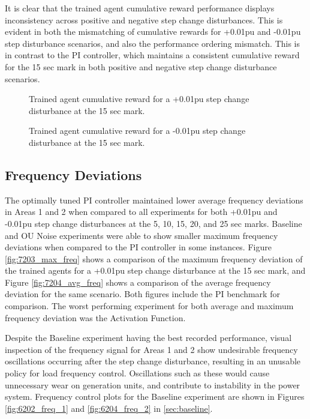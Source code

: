 It is clear that the trained agent cumulative reward performance displays inconsistency across positive and negative step change disturbances. This is evident in both the mismatching of cumulative rewards for +0.01pu and -0.01pu step disturbance scenarios, and also the performance ordering mismatch. This is in contrast to the PI controller, which maintains a consistent cumulative reward for the 15 sec mark in both positive and negative step change disturbance scenarios.
\begin{figure}[h]
	\begin{minipage}[t]{0.50\textwidth}
		\centering
		\resizebox{7cm}{!}{}
		\caption{Trained agent cumulative reward for a +0.01pu step change disturbance at the 15 sec mark.}\label{fig:7201_cum_reward_pos}
	\end{minipage}
	\hspace{0.25cm}
	\begin{minipage}[t]{0.50\textwidth}
		\resizebox{7cm}{!}{}
		\caption{Trained agent cumulative reward for a -0.01pu step change disturbance at the 15 sec mark.}\label{fig:7202_cum_reward_neg}
	\end{minipage}
\end{figure}

\subsection{Frequency Deviations}
The optimally tuned PI controller maintained lower average frequency deviations in Areas 1 and 2 when compared to all experiments for both +0.01pu and -0.01pu step change disturbances at the 5, 10, 15, 20, and 25 sec marks. Baseline and OU Noise experiments were able to show smaller maximum frequency deviations when compared to the PI controller in some instances. Figure \ref{fig:7203_max_freq} shows a comparison of the maximum frequency deviation of  the trained agents for a +0.01pu step change disturbance at the 15 sec mark, and Figure \ref{fig:7204_avg_freq} shows a comparison of the average frequency deviation for the same scenario. Both figures include the PI benchmark for comparison. The worst performing experiment for both average and maximum frequency deviation was the Activation Function.

Despite the Baseline experiment having the best recorded performance, visual inspection of the frequency signal for Areas 1 and 2 show undesirable frequency oscillations occurring after the step change disturbance, resulting in an unusable policy for load frequency control. Oscillations such as these would cause unnecessary wear on generation units, and contribute to instability in the power system. Frequency control plots for the Baseline experiment are shown in Figures \ref{fig:6202_freq_1} and \ref{fig:6204_freq_2} in \textsection \ref{sec:baseline}.

